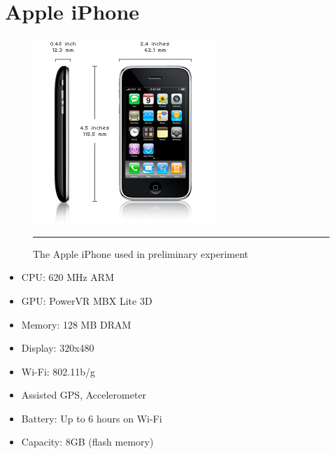\chapter{Apple iPhone}
\label{AppendixE}

\begin{figure}[htbp]
  \centering
    \includegraphics{./Primitives/iphone.jpg}
    \rule{35em}{0.5pt}
  \caption[Apple iPhone]{The Apple iPhone used in preliminary experiment}
\end{figure}

\begin{itemize}
	\item CPU: 620 MHz ARM
	\item GPU: PowerVR MBX Lite 3D
	\item Memory: 128 MB DRAM
	\item Display: 320x480
	\item Wi-Fi: 802.11b/g
	\item Assisted GPS, Accelerometer
	\item Battery: Up to 6 hours on Wi-Fi
	\item Capacity: 8GB (flash memory)
\end{itemize}

